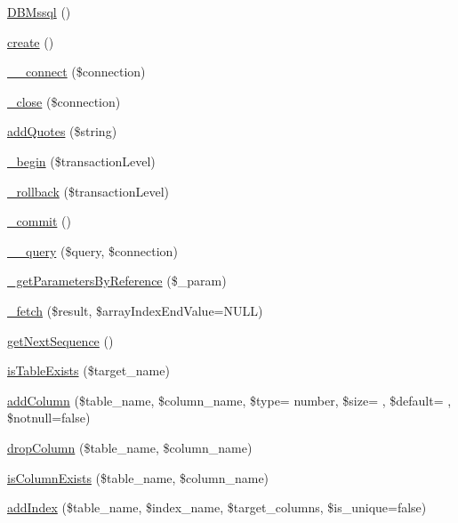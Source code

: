 \begin{DoxyCompactItemize}
\item 
\hyperlink{classDBMssql_a308e7ed895b32bedb958b2fa946fb499}{D\+B\+Mssql} ()
\item 
\hyperlink{classDBMssql_a1be3ce3432e43e0a5080ada450971345}{create} ()
\item 
\hyperlink{classDBMssql_a369f968ee79e1eb30e5d640c2294a7d1}{\+\_\+\+\_\+connect} (\$connection)
\item 
\hyperlink{classDBMssql_a64f2fc08d576cdcfc0dd3a80343a0e5a}{\+\_\+close} (\$connection)
\item 
\hyperlink{classDBMssql_ac380f1918abd17fd5cba28accfaec9fc}{add\+Quotes} (\$string)
\item 
\hyperlink{classDBMssql_a28ba9e00e3fce08dfabc334a1365fd5a}{\+\_\+begin} (\$transaction\+Level)
\item 
\hyperlink{classDBMssql_a36d00363d093e06fe3db4dbce6e8beaf}{\+\_\+rollback} (\$transaction\+Level)
\item 
\hyperlink{classDBMssql_a08f359cc1c5ce91fde7139446252e8c4}{\+\_\+commit} ()
\item 
\hyperlink{classDBMssql_aa2d0d2f6680d70399f493b567d94ed92}{\+\_\+\+\_\+query} (\$query, \$connection)
\item 
\hyperlink{classDBMssql_a09c8011c16ac2e01c6fca9d6f0e6b7f6}{\+\_\+get\+Parameters\+By\+Reference} (\$\+\_\+param)
\item 
\hyperlink{classDBMssql_aed12cc502a2d8ee9ce8821af12d45b9e}{\+\_\+fetch} (\$result, \$array\+Index\+End\+Value=N\+U\+L\+L)
\item 
\hyperlink{classDBMssql_ad4342b7988253c6bbeec102b2c454659}{get\+Next\+Sequence} ()
\item 
\hyperlink{classDBMssql_add743e9c5148edf4f393209b1f4b9cd6}{is\+Table\+Exists} (\$target\+\_\+name)
\item 
\hyperlink{classDBMssql_a4a5a3cc78312f22673d7e3a4d1a5c8cf}{add\+Column} (\$table\+\_\+name, \$column\+\_\+name, \$type= \textquotesingle{}number\textquotesingle{}, \$size= \textquotesingle{}\textquotesingle{}, \$default= \textquotesingle{}\textquotesingle{}, \$notnull=false)
\item 
\hyperlink{classDBMssql_a802707618ed283cd4143c82972b3ade5}{drop\+Column} (\$table\+\_\+name, \$column\+\_\+name)
\item 
\hyperlink{classDBMssql_a5a96979e7fed50503b902d2983fa507a}{is\+Column\+Exists} (\$table\+\_\+name, \$column\+\_\+name)
\item 
\hyperlink{classDBMssql_a6202a3b8e96252f91ef104a854cf556c}{add\+Index} (\$table\+\_\+name, \$index\+\_\+name, \$target\+\_\+columns, \$is\+\_\+unique=false)

\end{DoxyCompactItemize}
